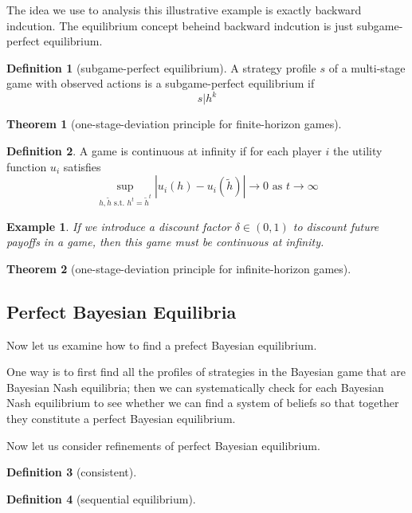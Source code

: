 \documentclass{article}
\newtheorem{Thm}{Theorem}[section]
\newtheorem{Eg}{Example}[section]
\theoremstyle{definition}
\newtheorem{Def}{Definition}[section]
\begin{document}
The idea we use to analysis this illustrative example is exactly backward indcution. The equilibrium concept beheind backward indcution is just subgame-perfect equilibrium.
\begin{Def}[subgame-perfect equilibrium]
    A strategy profile $s$ of a multi-stage game with observed actions is a subgame-perfect equilibrium if 
    \[s|h^k\]
\end{Def}

\begin{Thm}[one-stage-deviation principle for finite-horizon games]
    
\end{Thm}
\begin{Def}
    A game is continuous at infinity if for each player $i$ the utility function $u_i$ satisfies
    \[\sup_{h,\tilde{h}\text{ s.t. }h^t=\tilde{h}^t}\left|u_i(h)-u_i(\tilde{h})\right|\to 0 \text{  as  }t\to\infty\]
\end{Def}
\begin{Eg}
    If we introduce a discount factor $\delta\in(0,1)$ to discount future payoffs in a game, then this game must be continuous at infinity.
\end{Eg}
\begin{Thm}[one-stage-deviation principle for infinite-horizon games]
    
\end{Thm}






\subsection{Perfect Bayesian Equilibria}




Now let us examine how to find a prefect Bayesian equilibrium.\par 
One way is to first find all the profiles of strategies in the Bayesian game that are Bayesian Nash equilibria;
then we can systematically check for each Bayesian Nash equilibrium to see whether we can find a system of beliefs so that together they constitute a perfect Bayesian equilibrium.



Now let us consider refinements of perfect Bayesian equilibrium.
\begin{Def}[consistent]
    
\end{Def}

\begin{Def}[sequential equilibrium]
    
\end{Def}
\end{document}
